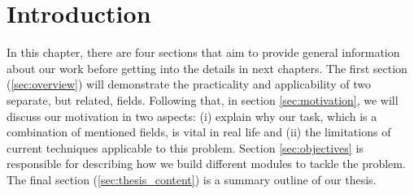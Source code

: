 \chapter{Introduction}
\label{chap-introduction}
\begin{ChapAbstract}
In this chapter, there are four sections that aim to provide general information about our work before getting into the details in next chapters.
The first section (\ref{sec:overview}) will demonstrate the practicality and applicability of two separate, but related, fields.
Following that, in section \ref{sec:motivation}, we will discuss our motivation in two aspects: (i) explain why our task, which is a combination of mentioned fields, is vital in real life and (ii) the limitations of current techniques applicable to this problem.
Section \ref{sec:objectives} is responsible for describing how we build different modules to tackle the problem.
The final section (\ref{sec:thesis_content}) is a summary outline of our thesis.
\end{ChapAbstract}






